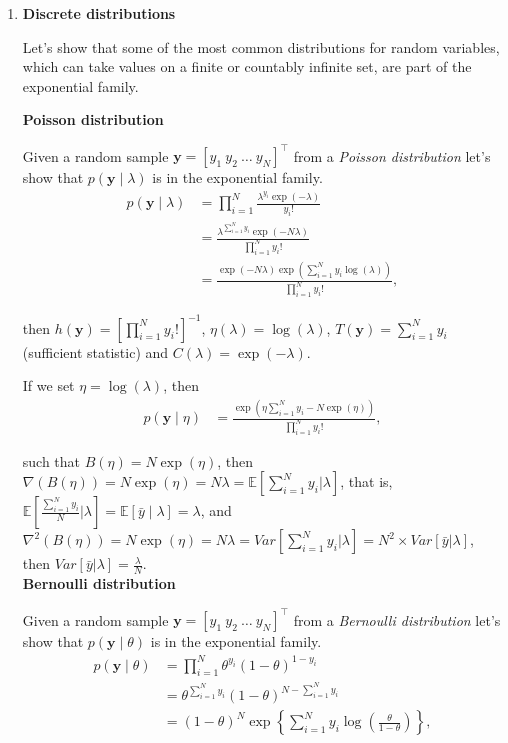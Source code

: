 \begin{enumerate}

\item \textbf{Discrete distributions}

Let's show that some of the most common distributions for random variables, which can take values on a finite or countably infinite set, are part of the exponential family.
 
\textbf{Poisson distribution} 

Given a random sample $\bm{y}=[y_1 \ y_2 \ \dots \ y_N]^{\top}$ from a \textit{Poisson distribution} let's show that $p(\bm{y}\mid \lambda)$ is in the exponential family.
\begin{align}
	p(\bm{y}\mid \lambda)&=\prod_{i=1}^N \frac{\lambda^{y_i} \exp(-\lambda)}{y_i!}\nonumber\\
	&=\frac{\lambda^{\sum_{i=1}^N y_i}\exp(-N\lambda)}{\prod_{i=1}^N y_i!}\nonumber\\
	&=\frac{\exp(-N\lambda)\exp(\sum_{i=1}^Ny_i\log(\lambda))}{\prod_{i=1}^N y_i!}\nonumber,
\end{align}

then $h(\bm{y})=\left[\prod_{i=1}^N y_i!\right]^{-1}$, $\eta(\lambda)=\log(\lambda)$, $T(\bm{y})=\sum_{i=1}^N y_i$ (sufficient statistic) and $C(\lambda)=\exp(-\lambda)$.

If we set $\eta=\log(\lambda)$, then 
\begin{align}
	p(\bm{y}\mid \eta)&=\frac{\exp(\eta\sum_{i=1}^Ny_i-N\exp(\eta))}{\prod_{i=1}^N y_i!},\nonumber
\end{align}

such that $B(\eta)=N\exp(\eta)$, then $\nabla(B(\eta))=N\exp(\eta)=N\lambda=\mathbb{E}\left[\sum_{i=1}^N y_i\biggr\rvert\lambda\right]$, that is, $\mathbb{E}\left[\frac{\sum_{i=1}^N y_i}{N}\biggr\rvert\lambda\right]=\mathbb{E}[\bar{y}\mid \lambda]=\lambda$, and $\nabla^2(B(\eta))=N\exp(\eta)=N\lambda=Var\left[\sum_{i=1}^N y_i\biggr\rvert\lambda\right]=N^2 \times Var\left[\bar{y}\rvert\lambda\right]$, then $Var\left[\bar{y}\rvert\lambda\right]=\frac{\lambda}{N}$.\\ 

\textbf{Bernoulli distribution}

Given a random sample $\bm{y}=[y_1 \ y_2 \ \dots \ y_N]^{\top}$ from a \textit{Bernoulli distribution} let's show that $p(\bm{y}\mid \theta)$ is in the exponential family.
\begin{align}
	p(\bm{y}\mid \theta)&=\prod_{i=1}^N \theta^{y_i}(1-\theta)^{1-y_i}\nonumber\\
	&=\theta^{\sum_{i=1}^N y_i}(1-\theta)^{N-\sum_{i=1}^N y_i}\nonumber\\
	&=(1-\theta)^N\exp\left\{\sum_{i=1}^N y_i\log\left(\frac{\theta}{1-\theta}\right)\right\}\nonumber,
\end{align}


\end{enumerate}
